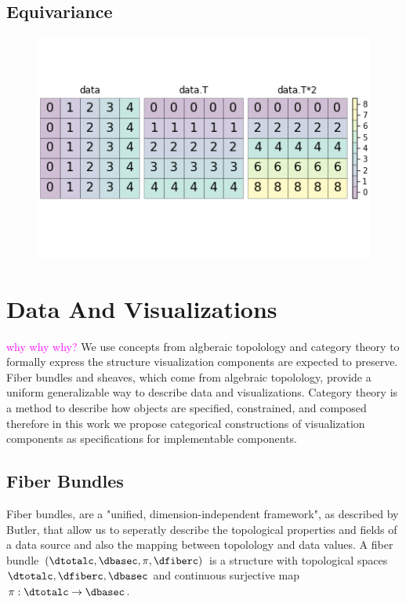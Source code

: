 \documentclass[10pt,journal,compsoc]{IEEEtran}
\newcommand{\note}[1]{\textcolor{magenta}{#1}}
\theoremstyle{definition}
\theoremstyle{remark}
\begin{document}
\subsection{Equivariance}
\begin{figure}[h!]
  \includegraphics[width=1\columnwidth]{equiviz.png}
\end{figure}

\section{Data And Visualizations}
\label{sec:atct}
\note{why why why?}
We use concepts from algberaic topolology and category theory to formally express the structure visualization components are expected to preserve.  Fiber bundles and sheaves, which come from algebraic topolology, provide a uniform generalizable way to describe data and visualizations. Category theory is a method to describe how objects are specified, constrained, and composed \cite{wielsManagementEvolvingSpecifications1998}\; therefore in this work we propose categorical constructions of visualization components as specifications for implementable components.

\subsection{Fiber Bundles}
\label{sec:atct:fiber-bundles}
Fiber bundles, are a "unified, dimension-independent framework", as described by Butler\cite{butlerVectorBundleClassesForm1992,butlerVisualizationModelBased1989}, that allow us to seperatly describe the topological properties and fields of a data source and also the mapping between topolology and data values. A fiber bundle $(\dtotalc, \dbasec, \pi, \dfiberc)$ is a structure with topological spaces $\dtotalc, \dfiberc, \dbasec$ and continuous surjective map $\pi: \dtotalc \rightarrow \dbasec$\cite{FiberBundle2020}. 
\end{document}
